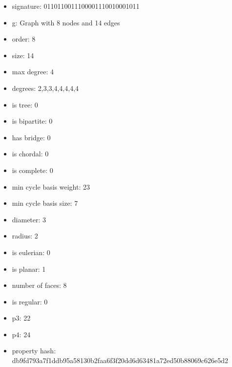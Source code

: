 \begin{itemize}
\item signature: 0110110011100001110010001011
\item g: Graph with 8 nodes and 14 edges
\item order: 8
\item size: 14
\item max degree: 4
\item degrees: 2,3,3,4,4,4,4,4
\item is tree: 0
\item is bipartite: 0
\item has bridge: 0
\item is chordal: 0
\item is complete: 0
\item min cycle basis weight: 23
\item min cycle basis size: 7
\item diameter: 3
\item radius: 2
\item is eulerian: 0
\item is planar: 1
\item number of faces: 8
\item is regular: 0
\item p3: 22
\item p4: 24
\item property hash: db9fd793a7f1ddb95a58130b2faa6f3f20dd6d63481a72ed50b88069c626e5d2
\end{itemize}
\newpage
\begin{figure}
\end{figure}
